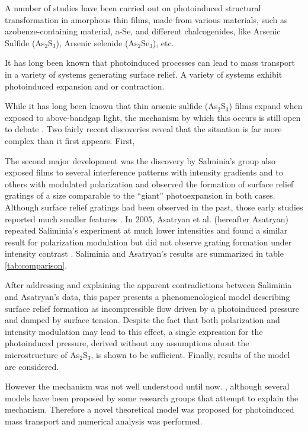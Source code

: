 A number of studies have been carried out on photoinduced structural
transformation in amorphous thin films, made from various materials,
such as azobenze-containing material, a-Se, and different
chalcogenides, like Arsenic Sulfide (As$_2$S$_3$), Arsenic selenide
(As$_2$Se$_3$), etc.

It has long been known that photoinduced processes can lead to mass
transport in a variety of systems generating surface relief.  A
variety of systems exhibit photoinduced expansion and or contraction.

While it has long been known that thin arsenic sulfide
(As$_{2}$S$_{3}$) films expand when exposed to above-bandgap light,
the mechanism by which this occurs is still open to debate
\cite{igo74, hegedus, ganjoo}. Two fairly recent discoveries reveal
that the situation is far more complex than it first appears. First,


The second major development was the discovery by  Salminia's group also exposed films to several
interference patterns with intensity gradients and to others with
modulated polarization and observed the formation of surface relief
gratings of a size comparable to the ``giant'' photoexpansion in both
cases. Although surface relief gratings had been observed in the past,
those early studies reported much smaller features \cite{galstyan}. In
2005, Asatryan et al.  (hereafter Asatryan) repeated Saliminia's
experiment at much lower intensities and found a similar result for
polarization modulation but did not observe grating formation under
intensity contrast \cite{asatryan05}. Saliminia and Asatryan's results
are summarized in table \ref{tab:comparison}.

After addressing and explaining the apparent contradictions between
Saliminia and Asatryan's data, this paper presents a phenomenological
model describing surface relief formation as incompressible flow
driven by a photoinduced pressure and damped by surface
tension. Despite the fact that both polarization and intensity
modulation may lead to this effect, a single expression for the
photoinduced pressure, derived without any assumptions about the
microstructure of As$_2$S$_3$, is shown to be sufficient. Finally,
results of the model are considered.

However the mechanism was not
well understood until now. , although several models
have been proposed by some research groups that attempt to explain the
mechanism. Therefore a novel theoretical model was proposed for
photoinduced mass transport and numerical analysis was performed.
